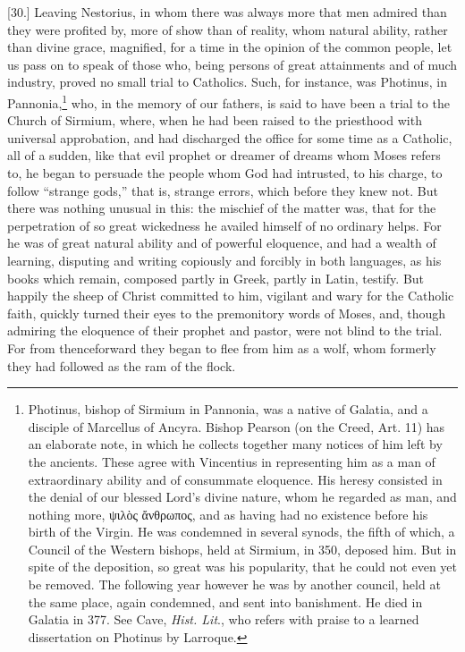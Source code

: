 [30.] Leaving Nestorius, in whom there was always more that men admired than they were profited by, more of show than of reality, whom natural ability, rather than divine grace, magnified, for a time in the opinion of the common people, let us pass on to speak of those who, being persons of great attainments and of much industry, proved no small trial to Catholics. Such, for instance, was Photinus, in Pannonia,\footnote{Photinus, bishop of Sirmium in Pannonia, was a native of Galatia, and a disciple of Marcellus of Ancyra. Bishop Pearson (on the Creed, Art. 11) has an elaborate note, in which he collects together many notices of him left by the ancients. These agree with Vincentius in representing him as a man of extraordinary ability and of consummate eloquence. His heresy consisted in the denial of our blessed Lord’s divine nature, whom he regarded as man, and nothing more, \textgreek{ψιλὸς ἄνθρωπος}, and as having had no existence before his birth of the Virgin. He was condemned in several synods, the fifth of which, a Council of the Western bishops, held at Sirmium, in 350, deposed him. But in spite of the deposition, so great was his popularity, that he could not even yet be removed. The following year however he was by another council, held at the same place, again condemned, and sent into banishment. He died in Galatia in 377. See Cave, \emph{Hist. Lit}., who refers with praise to a learned dissertation on Photinus by Larroque.} who, in the memory of our fathers, is said to have been a trial to the Church of Sirmium, where, when he had been raised to the priesthood with universal approbation, and had discharged the office for some time as a Catholic, all of a sudden, like that evil prophet or dreamer of dreams whom Moses refers to, he began to persuade the people whom God had intrusted, to his charge, to follow “strange gods,” that is, strange errors, which before they knew not. But there was nothing unusual in this: the mischief of the matter was, that for the perpetration of so great wickedness he availed himself of no ordinary helps. For he was of great natural ability and of powerful eloquence, and had a wealth of learning, disputing and writing copiously and forcibly in both languages, as his books which remain, composed partly in Greek, partly in Latin, testify. But happily the sheep of Christ committed to him, vigilant and wary for the Catholic faith, quickly turned their eyes to the premonitory words of Moses, and, though admiring the eloquence of their prophet and pastor, were not blind to the trial. For from thenceforward they began to flee from him as a wolf, whom formerly they had followed as the ram of the flock.

